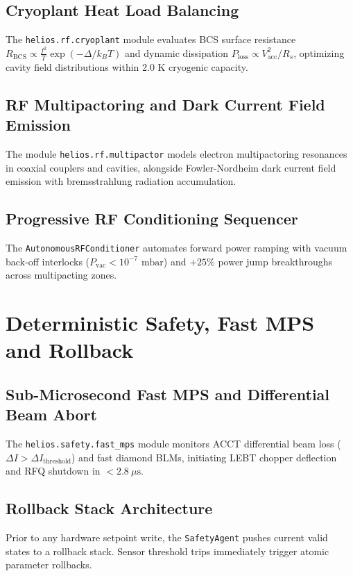 \documentclass[11pt,a4paper]{report}
\begin{document}
\section{Cryoplant Heat Load Balancing}
The \texttt{helios.rf.cryoplant} module evaluates BCS surface resistance $R_{\text{BCS}} \propto \frac{f^2}{T} \exp(-\Delta/k_B T)$ and dynamic dissipation $P_{\text{loss}} \propto V_{\text{acc}}^2 / R_s$, optimizing cavity field distributions within 2.0 K cryogenic capacity.

\section{RF Multipactoring and Dark Current Field Emission}
The module \texttt{helios.rf.multipactor} models electron multipactoring resonances in coaxial couplers and cavities, alongside Fowler-Nordheim dark current field emission with bremsstrahlung radiation accumulation.

\section{Progressive RF Conditioning Sequencer}
The \texttt{AutonomousRFConditioner} automates forward power ramping with vacuum back-off interlocks ($P_{\text{vac}} < 10^{-7}\text{ mbar}$) and $+25\%$ power jump breakthroughs across multipacting zones.

\chapter{Deterministic Safety, Fast MPS and Rollback}

\section{Sub-Microsecond Fast MPS and Differential Beam Abort}
The \texttt{helios.safety.fast\_mps} module monitors ACCT differential beam loss ($\Delta I > \Delta I_{\text{threshold}}$) and fast diamond BLMs, initiating LEBT chopper deflection and RFQ shutdown in $<2.8\ \mu\text{s}$.

\section{Rollback Stack Architecture}
Prior to any hardware setpoint write, the \texttt{SafetyAgent} pushes current valid states to a rollback stack. Sensor threshold trips immediately trigger atomic parameter rollbacks.
\end{document}
